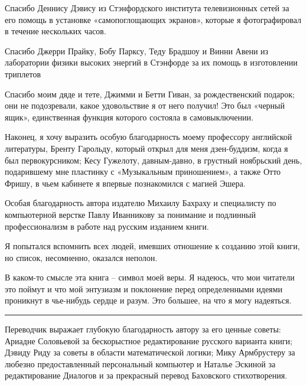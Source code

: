 \documentclass[../main.tex]{subfiles}
\begin{document}
Спасибо Деннису Дэвису из Стэнфордского института телевизионных сетей за его помощь в установке «самопоглощающих экранов», которые я фотографировал в течение нескольких часов.

Спасибо Джерри Прайку, Бобу Парксу, Теду Брадшоу и Винни Авени из лаборатории физики высоких энергий в Стэнфорде за их помощь в изготовлении триплетов

Спасибо моим дяде и тете, Джимми и Бетти Гиван, за рождественский подарок; они не подозревали, какое удовольствие я от него получил!
Это был «черный ящик», единственная функция которого состояла в самовыключении.

Наконец, я хочу выразить особую благодарность моему профессору английской литературы, Бренту Гарольду, который открыл для меня дзен-буддизм, когда я был первокурсником; Кесу Гужелоту, давным-давно, в грустный ноябрьский день, подарившему мне пластинку с «Музыкальным приношением», а также Отто Фришу, в чьем кабинете я впервые познакомился с магией Эшера.

Особая благодарность автора издателю Михаилу Бахраху и специалисту по компьютерной верстке Павлу Иванникову за понимание и подлинный профессионализм в работе над русским изданием книги.

Я попытался вспомнить всех людей, имевших отношение к созданию этой книги, но список, несомненно, оказался неполон.

В каком-то смысле эта книга \--- символ моей веры. Я надеюсь, что мои читатели это поймут и что мой энтузиазм и поклонение перед определенными идеями проникнут в чье-нибудь сердце и разум. Это большее, на что я могу надеяться.

\fancybreak{$\ast$ $\ast$ $\ast$}

\indent
Переводчик выражает глубокую благодарность автору за его ценные советы: Ариадне Соловьевой за бескорыстное редактирование русского варианта книги; Дэвиду Риду за советы в области математической логики; Мику Армбрустеру за любезно предоставленный персональный компьютер и Наталье Эскиной за редактирование Диалогов и за прекрасный перевод Баховского стихотворения.
\end{document}
